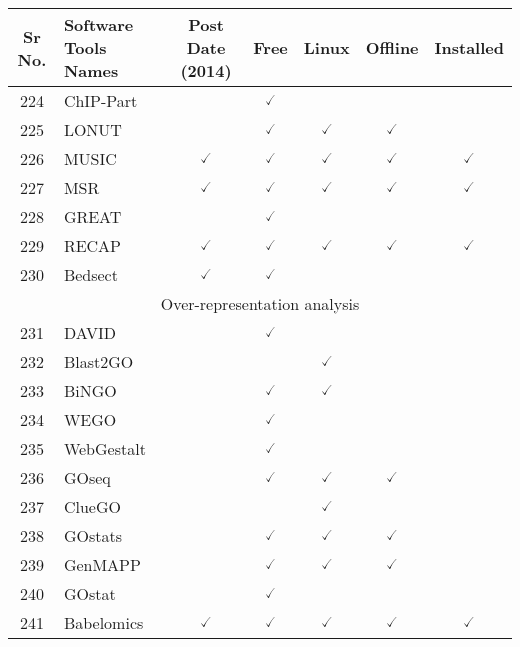 \documentclass[10pt,letterpaper]{article}
\begin{document}
\begin{table}[!ht]
\begin{adjustwidth}{-2.25in}{0in} %
\centering
\begin{tabular}{|c|l|c|c|c|c|c|}
\hline
Sr No. & Software Tools Names & Post Date (2014) & Free & Linux & Offline & Installed \\ \hline
\hline
224 & ChIP-Part\cite{tsunoi2002method} & & $\checked$ & & & \\
225 & LONUT\cite{wang2013locating} & & $\checked$ & $\checked$ & $\checked$ & \\ 
226 & MUSIC\cite{harmanci2014music} & $\checked$ & $\checked$ & $\checked$ & $\checked$ & $\checked$  \\ 
227 & MSR\cite{knijnenburg2014multiscale} & $\checked$ & $\checked$ & $\checked$ & $\checked$ & $\checked$  \\ 
228 & GREAT\cite{mclean2010great} & & $\checked$ & & & \\ 
229 & RECAP\cite{chitpin2018recap} & $\checked$ & $\checked$ & $\checked$ & $\checked$ & $\checked$  \\ 
230 & Bedsect\cite{mishra2018bedsect} & $\checked$ & $\checked$ & & & \\ \hline
\hline
\multicolumn{7}{|c|}{Over-representation analysis} \\ \hline
\hline
231 & DAVID\cite{dennis2003david} & & $\checked$ & & & \\ 
232 & Blast2GO\cite{conesa2005blast2go} & & & $\checked$ & & \\ 
233 & BiNGO\cite{maere2005bingo} & & $\checked$ & $\checked$ & & \\
234 & WEGO\cite{ye2006wego} & & $\checked$ & & & \\ 
235 & WebGestalt\cite{zhang2005webgestalt} & & $\checked$ & & & \\
236 & GOseq\cite{young2010gene} & & $\checked$ & $\checked$ & $\checked$ & \\ 
237 & ClueGO\cite{bindea2009cluego} & & & $\checked$ & & \\ 
238 & GOstats\cite{falcon2006using} & & $\checked$ & $\checked$ & $\checked$ & \\
239 & GenMAPP\cite{doniger2003mappfinder} & & $\checked$ & $\checked$ & $\checked$ & \\
240 & GOstat\cite{beissbarth2004gostat} & & $\checked$ & & & \\ 
241 & Babelomics\cite{alonso2015babelomics} & $\checked$ & $\checked$ & $\checked$ & $\checked$ & $\checked$ \\ 

\end{tabular}
\end{adjustwidth}
\end{table}
\end{document}
